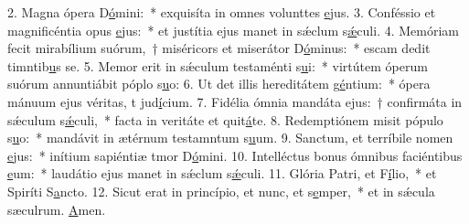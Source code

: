 2. Magna ópera D\uline{ó}mini:~* exquisíta in omnes volunttes \uline{e}jus.
3. Conféssio et magnificéntia opus \uline{e}jus:~* et justítia ejus manet in sǽclum s\uline{ǽ}culi.
4. Memóriam fecit mirabílium suórum,~† miséricors et miserátor D\uline{ó}minus:~* escam dedit timntib\uline{u}s se.
5. Memor erit in sǽculum testaménti s\uline{u}i:~* virtútem óperum suórum annuntiábit póplo s\uline{u}o:
6. Ut det illis hereditátem g\uline{é}ntium:~* ópera mánuum ejus véritas, t jud\uline{í}cium.
7. Fidélia ómnia mandáta ejus:~† confirmáta in sǽculum s\uline{ǽ}culi,~* facta in veritáte et quit\uline{á}te.
8. Redemptiónem misit pópulo s\uline{u}o:~* mandávit in ætérnum testamntum s\uline{u}um.
9. Sanctum, et terríbile nomen \uline{e}jus:~* inítium sapiéntiæ tmor D\uline{ó}mini.
10. Intelléctus bonus ómnibus faciéntibus \uline{e}um:~* laudátio ejus manet in sǽclum s\uline{ǽ}culi.
11. Glória Patri, et F\uline{í}lio,~* et Spiríti S\uline{a}ncto.
12. Sicut erat in princípio, et nunc, et s\uline{e}mper,~* et in sǽcula sæculrum. \uline{A}men.

